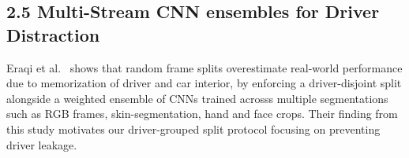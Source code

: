 \subsection{2.5 Multi-Stream CNN ensembles for Driver Distraction}
Eraqi et al.~\cite{eraqi2019driver} shows that random frame splits overestimate real-world performance due to memorization of driver and car interior, 
by enforcing a driver-disjoint split alongside a weighted ensemble of CNNs trained acrosss multiple segmentations such as RGB frames, skin-segmentation, hand and face crops. Their finding from this study motivates our driver-grouped split protocol focusing on preventing driver leakage.